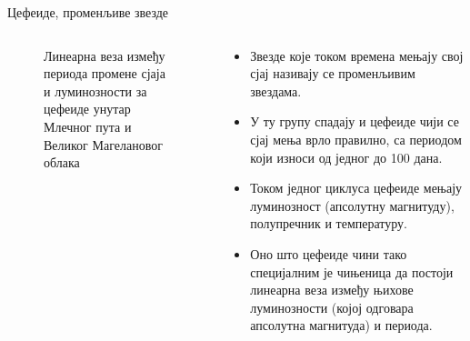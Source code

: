 \documentclass[aspectratio=169, xcolor=table, 10pt]{beamer}
\begin{document}
\begin{frame}{Цефеиде, променљиве звезде}
  \begin{columns}[T]
    \begin{column}{0.5\textwidth}
      \begin{figure}
        \centering
        \captionsetup{width=\wd0}
        \caption{Линеарна веза између периода промене сјаја и луминозности за цефеиде унутар Млечног пута и Великог Магелановог облака}
      \end{figure}
    \end{column}
    \begin{column}{0.5\textwidth}
      \begin{itemize}
        \item Звезде које током времена мењају свој сјај називају се променљивим звездама.
        \item У ту групу спадају и цефеиде чији се сјај мења врло правилно, са периодом који износи од једног до 100 дана.
        \item Током једног циклуса цефеиде мењају луминозност (апсолутну магнитуду), полупречник и температуру.
        \item Оно што цефеиде чини тако специјалним је чињеница да постоји линеарна веза између њихове луминозности (којој одговара апсолутна магнитуда) и периода.
      \end{itemize}
    \end{column}
  \end{columns}
\end{frame}
\end{document}
